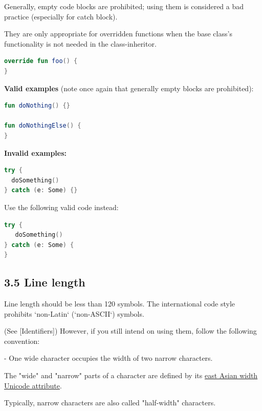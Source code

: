 Generally, empty code blocks are prohibited; using them is considered a bad practice (especially for catch block).

They are only appropriate for overridden functions when the base class's functionality is not needed in the class-inheritor.

\begin{lstlisting}[language=Kotlin]
override fun foo() {    
}
\end{lstlisting}


\textbf{Valid examples} (note once again that generally empty blocks are prohibited):



\begin{lstlisting}[language=Kotlin]
fun doNothing() {} 

fun doNothingElse() {
}
\end{lstlisting}


\textbf{Invalid examples:}

\begin{lstlisting}[language=Kotlin]
try {
  doSomething()
} catch (e: Some) {}
\end{lstlisting}


Use the following valid code instead:

\begin{lstlisting}[language=Kotlin]
try {
   doSomething()
} catch (e: Some) {
}
\end{lstlisting}


\subsection*{\textbf{3.5 Line length}}

\label{sec:3.5}



Line length should be less than 120 symbols. The international code style prohibits `non-Latin` (`non-ASCII`) symbols.

(See [Identifiers]) However, if you still intend on using them, follow the following convention:



- One wide character occupies the width of two narrow characters.

The "wide" and "narrow" parts of a character are defined by its \href{https://unicode.org/reports/tr11/}{east Asian width Unicode attribute}.

Typically, narrow characters are also called "half-width" characters.

